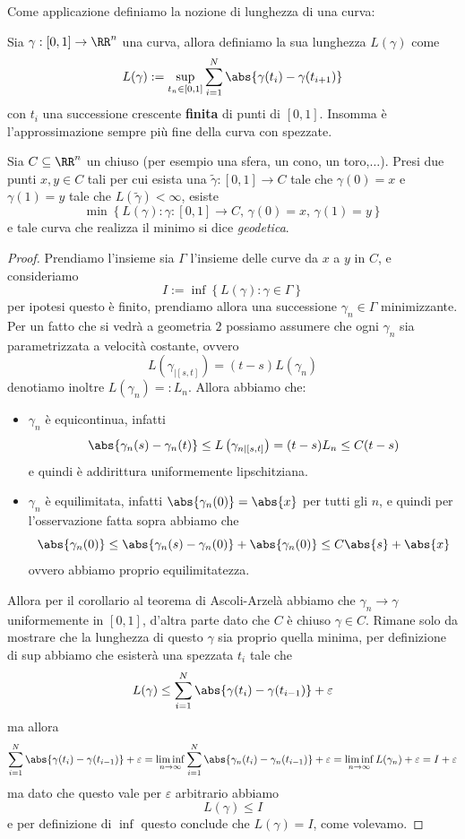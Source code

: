 \documentclass[11pt]{scrartcl}
\begin{document}
	Come applicazione definiamo la nozione di lunghezza di una curva:
	\begin{definition}
		Sia $\gamma:[0,1]\to \RR^n$ una curva, allora definiamo la sua lunghezza $L(\gamma)$ come
		$$L(\gamma):=\sup_{t_n\in [0,1]}\sum_{i=1}^N \abs{\gamma(t_i)-\gamma(t_{i+1})}$$
		con $t_i$ una successione crescente \textbf{finita} di punti di $[0,1]$. Insomma è l'approssimazione sempre più fine della curva con spezzate.
	\end{definition}
	\begin{theorem}
		Sia $C\subseteq \RR^n$ un chiuso (per esempio una sfera, un cono, un toro,$\dots$). Presi due punti $x,y\in C$ tali per cui esista una $\tilde{\gamma}:[0,1]\to C$ tale che $\gamma(0)=x$ e $\gamma(1)=y$ tale che $L(\tilde{\gamma})<\infty$, esiste 
		$$\min\left\{L(\gamma):\gamma:[0,1]\to C,\,\gamma(0)=x,\,\gamma(1)=y\right\}$$
		e tale curva che realizza il minimo si dice \textit{geodetica}.
	\end{theorem}
	\begin{proof}
		Prendiamo l'insieme sia $\Gamma$ l'insieme delle curve da $x$ a $y$ in $C$, e consideriamo
		$$I:=\inf\left\{L(\gamma):\gamma\in\Gamma\right\}$$
		per ipotesi questo è finito, prendiamo allora una successione $\gamma_n\in \Gamma$ minimizzante. Per un fatto che si vedrà a geometria $2$ possiamo assumere che ogni $\gamma_n$ sia parametrizzata a velocità costante, ovvero 
		$$L\left(\gamma_{\mid [s,t]}\right)=(t-s)L(\gamma_n)$$
		denotiamo inoltre $L(\gamma_n)=:L_n$. Allora abbiamo che:
		\begin{itemize}
			\item $\gamma_n$ è equicontinua, infatti 
			$$\abs{\gamma_n(s)-\gamma_n(t)}\le L\left(\gamma_{n\mid [s,t]}\right)=(t-s)L_n\le C(t-s)$$
			e quindi è addirittura uniformemente lipschitziana.
			\item $\gamma_n$ è equilimitata, infatti $\abs{\gamma_n(0)}=\abs{x}$ per tutti gli $n$, e quindi per l'osservazione fatta sopra abbiamo che 
			$$\abs{\gamma_n(0)}\le \abs{\gamma_n(s)-\gamma_n(0)}+\abs{\gamma_n(0)}\le C\abs{s}+\abs{x}$$
			ovvero abbiamo proprio equilimitatezza.
		\end{itemize}
		Allora per il corollario al teorema di Ascoli-Arzelà abbiamo che $\gamma_n\to \gamma$ uniformemente in $[0,1]$, d'altra parte dato che $C$ è chiuso $\gamma\in C$. Rimane solo da mostrare che la lunghezza di questo $\gamma$ sia proprio quella minima, per definizione di sup abbiamo che esisterà una spezzata $t_i$ tale che
		$$L(\gamma)\le \sum_{i=1}^{N}\abs{\gamma(t_i)-\gamma(t_{i-1})}+\varepsilon$$
		ma allora
		$$\sum_{i=1}^{N}\abs{\gamma(t_i)-\gamma(t_{i-1})}+\varepsilon=\liminf_{n\to\infty}\sum_{i=1}^{N}\abs{\gamma_n(t_i)-\gamma_n(t_{i-1})}+\varepsilon=\liminf_{n\to\infty}L(\gamma_n)+\varepsilon=I+\varepsilon$$
		ma dato che questo vale per $\varepsilon$ arbitrario abbiamo 
		$$L(\gamma)\le I$$
		e per definizione di $\inf$ questo conclude che $L(\gamma)=I$, come volevamo.
	\end{proof}
	
\end{document}
